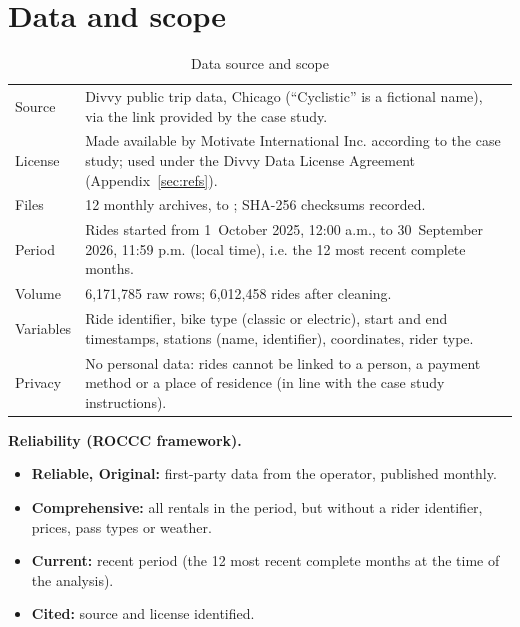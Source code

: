 \section{Data and scope}
\label{sec:data}

\begin{table}[H]
\caption{Data source and scope}
\label{tab:scope}
\small
\begin{tabularx}{\linewidth}{L{3.6cm} Y}
\toprule
{} &  \\
\midrule
Source & Divvy public trip data, Chicago (``Cyclistic'' is a fictional name), via the link provided by the case study. \\
License & Made available by Motivate International Inc. according to the case study; used under the Divvy Data License Agreement (Appendix~\ref{sec:refs}). \\
Files & 12 monthly archives,  to ; SHA-256 checksums recorded. \\
Period & Rides started from 1~October 2025, 12:00 a.m., to 30~September 2026, 11:59 p.m. (local time), i.e. the 12 most recent complete months. \\
Volume & 6,171,785 raw rows; 6,012,458 rides after cleaning. \\
Variables & Ride identifier, bike type (classic or electric), start and end timestamps, stations (name, identifier), coordinates, rider type. \\
Privacy & No personal data: rides cannot be linked to a person, a payment method or a place of residence (in line with the case study instructions). \\
\bottomrule
\end{tabularx}
\end{table}

\textbf{Reliability (ROCCC framework).}
\begin{itemize}
  \item \textbf{Reliable, Original:} first-party data from the operator, published monthly.
  \item \textbf{Comprehensive:} all rentals in the period, but without a rider identifier, prices, pass types or weather.
  \item \textbf{Current:} recent period (the 12 most recent complete months at the time of the analysis).
  \item \textbf{Cited:} source and license identified.
\end{itemize}

